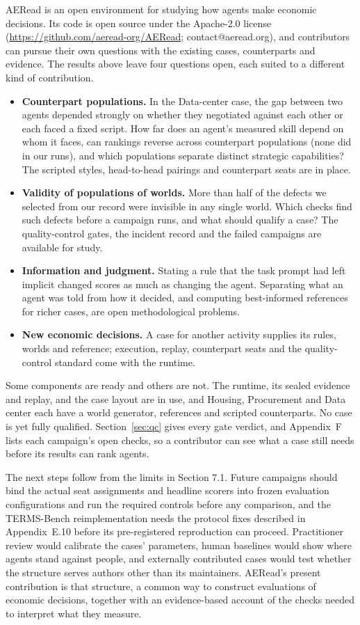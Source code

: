 AERead is an open environment for studying how agents make economic
decisions. Its code is open source under the Apache-2.0 license
(\url{https://github.com/aeread-org/AERead}; contact@aeread.org), and contributors can
pursue their own questions with the existing cases, counterparts and
evidence. The results above leave four questions open, each suited to a
different kind of contribution.
\begin{itemize}
\item \textbf{Counterpart populations.} In the Data-center case, the gap between two
agents depended strongly on whether they negotiated against each other or each faced a fixed script.
How far does an agent's measured skill depend on whom it faces, can
rankings reverse across counterpart populations (none did in our runs),
and which populations separate distinct strategic capabilities? The
scripted styles, head-to-head pairings and counterpart seats are in place.
\item \textbf{Validity of populations of worlds.} More than half of the defects
we selected from our record were invisible in any single world. Which checks find
such defects before a campaign runs, and what should qualify a case? The
quality-control gates, the incident record and the failed campaigns are
available for study.
\item \textbf{Information and judgment.} Stating a rule that the task prompt had left
implicit changed scores as much as changing the agent. Separating what an
agent was told from how it decided, and computing best-informed references
for richer cases, are open methodological problems.
\item \textbf{New economic decisions.} A case for another activity
supplies its rules, worlds and reference; execution, replay, counterpart
seats and the quality-control standard come with the runtime.
\end{itemize}

Some components are ready and others are not. The runtime, its sealed evidence and
replay, and the case layout are in use, and Housing, Procurement and Data
center each have a world generator, references and scripted counterparts.
No case is yet fully qualified. Section~\ref{sec:qc} gives every gate
verdict, and Appendix~F lists each campaign's open checks, so a contributor
can see what a case still needs before its results can rank agents.

The next steps follow from the limits in Section 7.1. Future campaigns should bind
the actual seat assignments and headline scorers into frozen evaluation
configurations and run the required controls before any comparison, and the
TERMS-Bench reimplementation needs the protocol fixes described in
Appendix~E.10 before its pre-registered reproduction can proceed. Practitioner review would
calibrate the cases' parameters, human baselines would show where agents
stand against people, and externally contributed cases would test whether
the structure serves authors other than its maintainers. AERead's present
contribution is that structure, a common way to construct evaluations of
economic decisions, together with an evidence-based account of the checks
needed to interpret what they measure.
